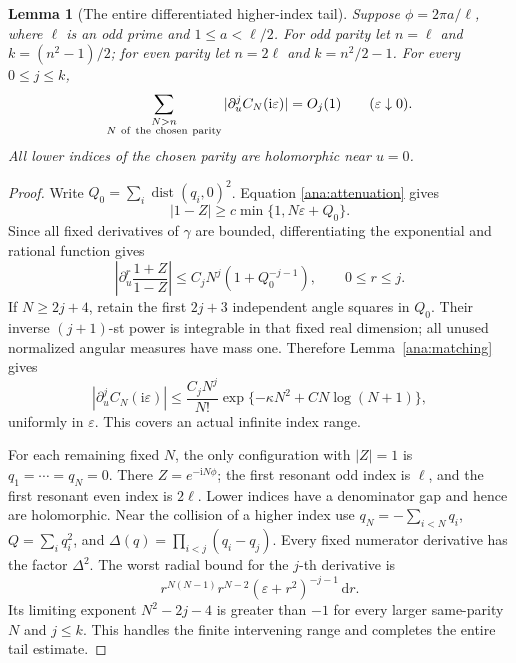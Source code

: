 \documentclass[11pt]{article}
\numberwithin{equation}{section}
\newtheorem{lemma}[theorem]{Lemma}
\theoremstyle{definition}
\newcommand{\ii}{\mathrm i}
\newcommand{\dd}{\,\mathrm d}
\newcommand{\eps}{\varepsilon}
\begin{document}
\begin{lemma}[The entire differentiated higher-index tail]
\label{ana:positivetail}
Suppose \(\phi=2\pi a/\ell\), where \(\ell\) is an odd prime and
\(1\le a<\ell/2\). For odd parity let \(n=\ell\) and
\(k=(n^2-1)/2\); for even parity let \(n=2\ell\) and
\(k=n^2/2-1\). For every \(0\le j\le k\),
\[
 \sum_{\substack{N>n\\N\ {\rm of\ the\ chosen\ parity}}}
 |\partial_u^j C_N(\ii\eps)|=O_j(1)
 \qquad(\eps\downarrow0).
\]
All lower indices of the chosen parity are holomorphic near \(u=0\).
\end{lemma}
\begin{proof}
Write \(Q_0=\sum_i\operatorname{dist}(q_i,0)^2\).
Equation \eqref{ana:attenuation} gives
\[
 |1-Z|\ge c\min\{1,N\eps+Q_0\}.
\]
Since all fixed derivatives of \(\gamma\) are bounded, differentiating
the exponential and rational function gives
\[
 \left|\partial_u^r\frac{1+Z}{1-Z}\right|
 \le C_j N^j(1+Q_0^{-j-1}),\qquad 0\le r\le j.
\]
If \(N\ge2j+4\), retain the first \(2j+3\) independent angle
squares in \(Q_0\). Their inverse \((j+1)\)-st power is integrable
in that fixed real dimension; all unused normalized angular measures
have mass one. Therefore Lemma~\ref{ana:matching} gives
\[
 |\partial_u^jC_N(\ii\eps)|
 \le\frac{C_jN^j}{N!}
       \exp\{-\kappa N^2+C N\log(N+1)\},
\]
uniformly in \(\eps\). This covers an actual infinite index range.

For each remaining fixed \(N\), the only configuration with
\(|Z|=1\) is \(q_1=\cdots=q_N=0\). There \(Z=e^{-\ii N\phi}\);
the first resonant odd index is \(\ell\), and the first resonant
even index is \(2\ell\). Lower indices have a denominator gap and
hence are holomorphic. Near the collision of a higher index use
\(q_N=-\sum_{i<N}q_i\), \(Q=\sum_iq_i^2\), and
\(\Delta(q)=\prod_{i<j}(q_i-q_j)\).
Every fixed numerator derivative has the factor \(\Delta^2\).
The worst radial bound for the \(j\)-th derivative is
\[
 r^{N(N-1)}r^{N-2}(\eps+r^2)^{-j-1}\dd r.
\]
Its limiting exponent \(N^2-2j-4\) is greater than \(-1\) for
every larger same-parity \(N\) and \(j\le k\). This handles the
finite intervening range and completes the entire tail estimate.
\end{proof}
\end{document}
